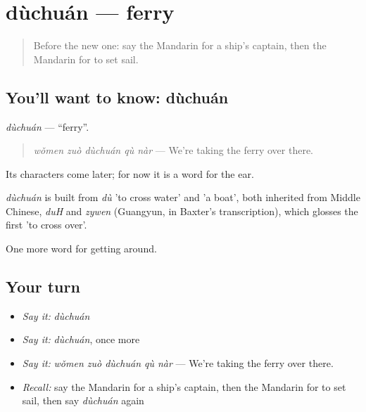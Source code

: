 \section[dùchuán]{dùchuán — ferry}

\label{lesson:ZH-C411-duchuan}



\begin{quote}
Before the new one: say the Mandarin for a ship's captain, then the Mandarin for to set sail.
\end{quote}

\subsection*{You'll want to know: dùchuán}
\emph{dùchuán} — \textquotedblleft{}ferry\textquotedblright{}.

\begin{quote}
\emph{wǒmen zuò dùchuán qù nàr} — We're taking the ferry over there.
\end{quote}

Its characters come later; for now it is a word for the ear.

\begin{cousinweb}
\emph{dùchuán} is built from \emph{dù} 'to cross water' and  'a boat', both inherited from Middle Chinese, \emph{duH} and \emph{zywen} (Guangyun, in Baxter's transcription), which glosses the first 'to cross over'.
\end{cousinweb}

\begin{grammarlens}[title={What you've built}]
One more word for getting around.
\end{grammarlens}

\subsection*{Your turn}
\begin{itemize}
\raggedright
  \item \emph{Say it:} \emph{dùchuán}
  \item \emph{Say it:} \emph{dùchuán}, once more
  \item \emph{Say it:} \emph{wǒmen zuò dùchuán qù nàr} — We're taking the ferry over there.
  \item \emph{Recall:} say the Mandarin for a ship's captain, then the Mandarin for to set sail, then say \emph{dùchuán} again
\end{itemize}

